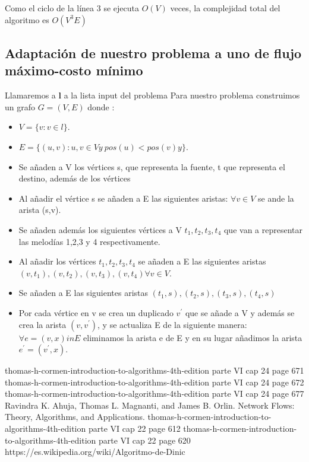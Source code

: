 \documentclass[sn-mathphys,Numbered]{sn-jnl}%
\theoremstyle{thmstyleone}%
\theoremstyle{thmstyletwo}%
\theoremstyle{thmstylethree}%
\begin{document}
Como el ciclo de la l\'inea 3 se ejecuta $O(V)$ veces, la complejidad total del algoritmo es $O(V^3E)$

\subsection{Adaptación de nuestro problema a uno de flujo máximo-costo mínimo}
Llamaremos a \textbf{l} a la lista input del problema 
Para nuestro problema construimos un grafo $G=(V,E)$ donde :\\
\begin{itemize}
    \item $V = \{ v : v\in l\}$.
    \item  $E = \{(u,v): u,v \in V y~ pos(u) < pos(v) y \}$.
    \item Se añaden a V los vértices s, que representa la fuente, t que representa el destino, además de los vértices 
    \item Al añadir el vértice s se añaden a E las siguientes aristas: $\forall v \in V$ se ande la arista (s,v).
    \item Se añaden además los siguientes vértices a V $t_1,t_2,t_3,t_4$ que van a representar las melodías 1,2,3 y 4 respectivamente.
    \item Al añadir los vértices $t_1,t_2,t_3,t_4$ se añaden a E las siguientes aristas $(v,t_1),(v,t_2),(v,t_3),(v,t_4) \forall v \in V$.
    \item Se añaden a E las siguientes aristas $(t_1,s),(t_2,s),(t_3,s),(t_4,s)$
    \item Por cada vértice en v se crea un duplicado $v^'$ que se añade a V y además se crea la arista $(v,v^{'})$, y se actualiza E de la siguiente manera: $\forall e = (v,x) in E $ eliminamos la arista e de E y en su lugar añadimos la arista $e^{'} = (v^{'},x)$.
    
    
\end{itemize}
\begin{thebibliography}{99}
 thomas-h-cormen-introduction-to-algorithms-4th-edition parte VI cap 24 page 671
  thomas-h-cormen-introduction-to-algorithms-4th-edition parte VI cap 24 page 672
  thomas-h-cormen-introduction-to-algorithms-4th-edition parte VI cap 24 page 677
 Ravindra K. Ahuja, Thomas L. Magnanti, and James B. Orlin. Network Flows: Theory, Algorithms, and Applications.
 thomas-h-cormen-introduction-to-algorithms-4th-edition parte VI cap 22 page 612
 thomas-h-cormen-introduction-to-algorithms-4th-edition parte VI cap 22 page 620
 https://es.wikipedia.org/wiki/Algoritmo-de-Dinic
\end{thebibliography}
\end{document}

